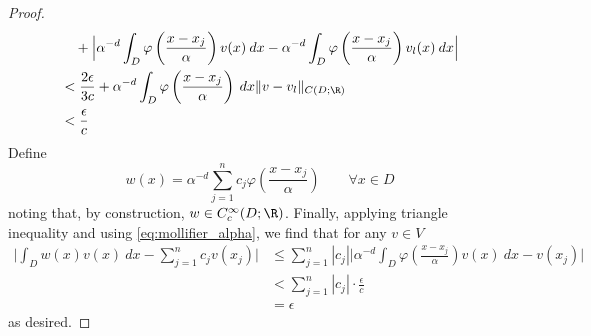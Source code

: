 {\begin{proof}
\begin{align}
\begin{split}
&\quad+ \Big|\alpha^{-d} \int_D \varphi \left ( \frac{x-x_j}{\alpha} \right ) v(x) \: dx - \alpha^{-d} \int_D \varphi \left ( \frac{x-x_j}{\alpha} \right ) v_l(x) \: dx\Big| \\
&< \frac{2\epsilon}{3c} + \alpha^{-d} \int_D \varphi \left ( \frac{x - x_j}{\alpha} \right ) \: dx \|v - v_l\|_{C(D;\R)} \\
&< \frac{\epsilon}{c}
\end{split}
\end{align}
Define
\[w(x) = \alpha^{-d} \sum_{j=1}^n c_j \varphi \left ( \frac{x - x_j}{\alpha} \right ) \qquad \forall x \in D\]
noting that, by construction,  \(w \in C^\infty_c(D;\R)\). Finally, applying triangle inequality and using \eqref{eq:mollifier_alpha}, we 
find that for any \(v \in V\)
\begin{align*}
\Big| \int_D w(x) v(x) \: dx - \sum_{j=1}^n c_j v(x_j) \Big| &\leq \sum_{j=1}^n |c_j| \Big| \alpha^{-d} \int_D \varphi \left ( \frac{x - x_j}{\alpha} \right )  v(x) \: dx - v(x_j)\Big| \\
&< \sum_{j=1}^n |c_j| \cdot \frac{\epsilon}{c} \\
&= \epsilon
\end{align*}
as desired.
\end{proof}

}
